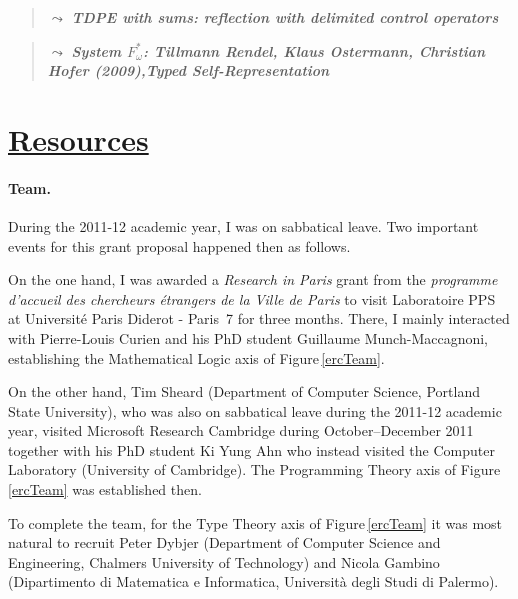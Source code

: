 \documentclass[11pt,twocolumn]{article}
\newcommand{\hide}[1]{}
\newcommand{\note}[1]%
{\begin{quote}{\color{blue}$\leadsto$ \bf\em #1}\end{quote}}
\newcommand{\hidenote}{\hide}
\newcommand{\SystemL}{\mbox{System~$L$}}
\begin{document}
\note{TDPE with sums: reflection with delimited control operators}

\note{System $F_\omega^*$: Tillmann Rendel, Klaus Ostermann, Christian
  Hofer (2009),Typed Self-Representation}

\hidenote{\SystemL internalisation of stacks?}

\hidenote{ssreflect?}


\section{\underline{Resources}}
\label{ResourcesSection}

\paragraph*{Team.}

During the 2011-12 academic year, I was on sabbatical leave.  Two important
events for this grant proposal happened then as follows.  

On the one hand, I was awarded a \emph{Research in Paris} grant from the
\emph{programme d'accueil des chercheurs \'etrangers de la Ville de Paris}
to visit Laboratoire PPS at Universit\'e Paris Diderot - Paris~7 for three
months.  There, I mainly interacted with Pierre-Louis Curien and his PhD
student Guillaume Munch-Maccagnoni, establishing the Mathematical Logic
axis of Figure\,\ref{ercTeam}.

On the other hand, Tim Sheard (Department of Computer Science,
Portland State University), who was also on sabbatical leave during the
2011-12 academic year, visited Microsoft Research Cambridge during
October--December 2011 together with his PhD student Ki Yung Ahn who
instead visited the Computer Laboratory (University of Cambridge).  The
Programming Theory axis of Figure\,\ref{ercTeam} was established then.

To complete the team, for the Type Theory axis of Figure\,\ref{ercTeam} it
was most natural to recruit Peter Dybjer (Department of Computer Science
and Engineering, Chalmers University of Technology) and Nicola Gambino
(Dipartimento di Matematica e Informatica, Universit\`a degli Studi di
Palermo).  
\end{document}
